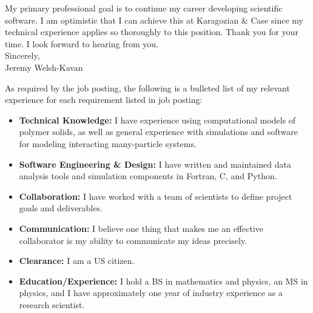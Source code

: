 \documentclass[]{letter}
\begin{document}
My primary professional goal is to continue my career developing scientific software. I am optimistic that I can achieve this at Karagozian \& Case since my technical experience applies so thoroughly to this position. Thank you for your time. I look forward to hearing from you. \\

Sincerely, \\
Jeremy Welsh-Kavan


\newpage


As required by the job posting, the following is a bulleted list of my relevant experience for each requirement listed in job posting:

\begin{itemize}

\item \textbf{Technical Knowledge:} I have experience using computational models of polymer solids, as well as general experience with simulations and software for modeling interacting many-particle systems. \\

\item \textbf{Software Engineering \& Design:} I have written and maintained data analysis tools and simulation components in Fortran, C, and Python. \\

\item \textbf{Collaboration:} I have worked with a team of scientists to define project goals and deliverables. \\

\item \textbf{Communication:} I believe one thing that makes me an effective collaborator is my ability to communicate my ideas precisely. \\

\item \textbf{Clearance:} I am a US citizen. \\

\item \textbf{Education/Experience:} I hold a BS in mathematics and physics, an MS in physics, and I have approximately one year of industry experience as a research scientist. \\

\end{itemize}
\end{document}
